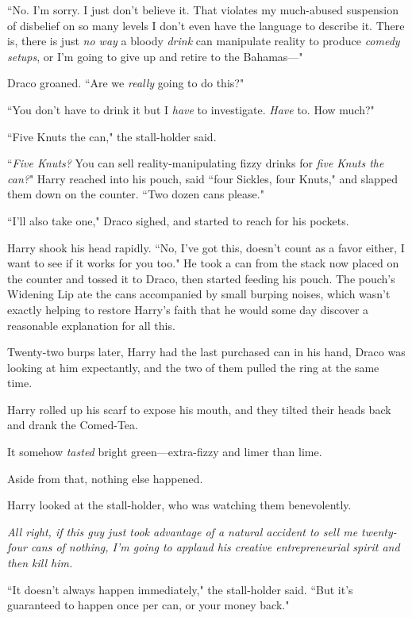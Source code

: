 ``No. I'm sorry. I just don't believe it. That violates my much-abused suspension of disbelief on so many levels I don't even have the language to describe it. There is, there is just \emph{no way} a bloody \emph{drink} can manipulate reality to produce \emph{comedy setups}, or I'm going to give up and retire to the Bahamas—"

Draco groaned. ``Are we \emph{really} going to do this?"

``You don't have to drink it but I \emph{have} to investigate. \emph{Have} to. How much?"

``Five Knuts the can," the stall-holder said.

``\emph{Five Knuts?} You can sell reality-manipulating fizzy drinks for \emph{five Knuts the can?}" Harry reached into his pouch, said ``four Sickles, four Knuts," and slapped them down on the counter. ``Two dozen cans please."

``I'll also take one," Draco sighed, and started to reach for his pockets.

Harry shook his head rapidly. ``No, I've got this, doesn't count as a favor either, I want to see if it works for you too." He took a can from the stack now placed on the counter and tossed it to Draco, then started feeding his pouch. The pouch's Widening Lip ate the cans accompanied by small burping noises, which wasn't exactly helping to restore Harry's faith that he would some day discover a reasonable explanation for all this.

Twenty-two burps later, Harry had the last purchased can in his hand, Draco was looking at him expectantly, and the two of them pulled the ring at the same time.

Harry rolled up his scarf to expose his mouth, and they tilted their heads back and drank the Comed-Tea.

It somehow \emph{tasted} bright green—extra-fizzy and limer than lime.

Aside from that, nothing else happened.

Harry looked at the stall-holder, who was watching them benevolently.

\emph{All right, if this guy just took advantage of a natural accident to sell me twenty-four cans of nothing, I'm going to applaud his creative entrepreneurial spirit and then kill him.}

``It doesn't always happen immediately," the stall-holder said. ``But it's guaranteed to happen once per can, or your money back."

